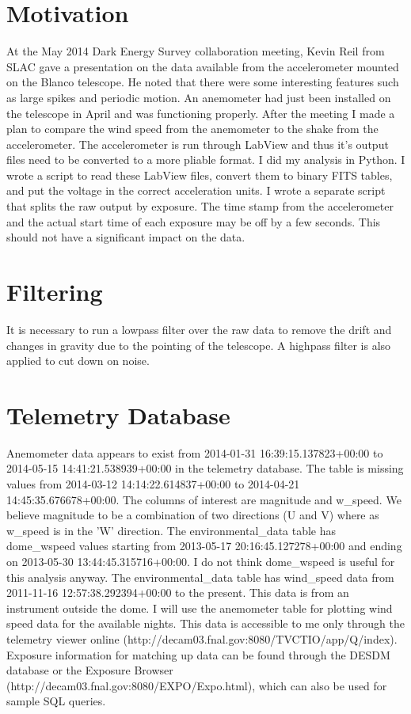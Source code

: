 \documentclass{article}
\begin{document}
\section{Motivation}
At the May 2014 Dark Energy Survey collaboration meeting, Kevin Reil from SLAC gave a presentation on the data available from the accelerometer mounted on the Blanco telescope. He noted that there were some interesting features such as large spikes and periodic motion. An anemometer had just been installed on the telescope in April and was functioning properly. After the meeting I made a plan to compare the wind speed from the anemometer to the shake from the accelerometer. 
	The accelerometer is run through LabView and thus it's output files need to be converted to a more pliable format. I did my analysis in Python. I wrote a script to read these LabView files, convert them to binary FITS tables, and put the voltage in the correct acceleration units. I wrote a separate script that splits the raw output by exposure. The time stamp from the accelerometer and the actual start time of each exposure may be off by a few seconds. This should not have a significant impact on the data. 
	
\section{Filtering}
	It is necessary to run a lowpass filter over the raw data to remove the drift and changes in gravity due to the pointing of the telescope. A highpass filter is also applied to cut down on noise. 

\section{Telemetry Database}
Anemometer data appears to exist from 2014-01-31 16:39:15.137823+00:00 to 2014-05-15 14:41:21.538939+00:00 in the telemetry database. 
The table is missing values from 2014-03-12 14:14:22.614837+00:00 to 2014-04-21 14:45:35.676678+00:00.
The columns of interest are magnitude and w\_speed. We believe magnitude to be a combination of two directions (U and V) where as w\_speed is in the 'W' direction. 
The environmental\_data table has dome\_wspeed values starting from 2013-05-17 20:16:45.127278+00:00 and ending on 2013-05-30 13:44:45.315716+00:00. I do not think dome\_wspeed is useful for this analysis anyway. 
The environmental\_data table has wind\_speed data from 2011-11-16 12:57:38.292394+00:00 to the present. This data is from an instrument outside the dome.
I will use the anemometer table for plotting wind speed data for the available nights. This data is accessible to me only through the telemetry viewer online (http://decam03.fnal.gov:8080/TVCTIO/app/Q/index). Exposure information for matching up data can be found through the DESDM database or the Exposure Browser (http://decam03.fnal.gov:8080/EXPO/Expo.html), which can also be used for sample SQL queries. 
\end{document}
